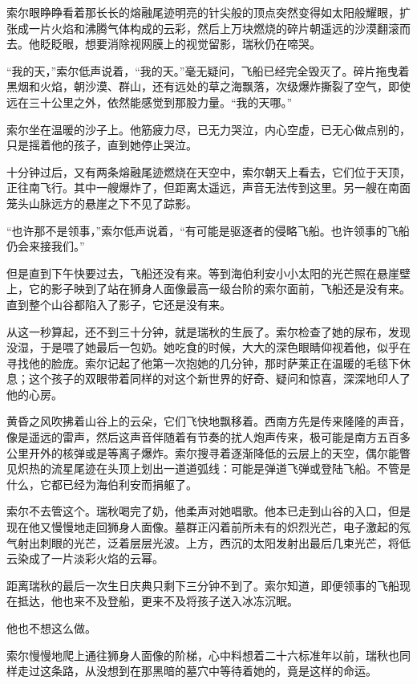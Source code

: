 \documentclass[AutoFakeBold=true]{book}
\begin{document}
索尔眼睁睁看着那长长的熔融尾迹明亮的针尖般的顶点突然变得如太阳般耀眼，扩张成一片火焰和沸腾气体构成的云彩，然后上万块燃烧的碎片朝遥远的沙漠翻滚而去。他眨眨眼，想要消除视网膜上的视觉留影，瑞秋仍在啼哭。

``我的天，''索尔低声说着，``我的天。''毫无疑问，飞船已经完全毁灭了。碎片拖曳着黑烟和火焰，朝沙漠、群山，还有远处的草之海飘落，次级爆炸撕裂了空气，即使远在三十公里之外，依然能感觉到那股力量。``我的天哪。''

索尔坐在温暖的沙子上。他筋疲力尽，已无力哭泣，内心空虚，已无心做点别的，只是摇着他的孩子，直到她停止哭泣。

十分钟过后，又有两条熔融尾迹燃烧在天空中，索尔朝天上看去，它们位于天顶，正往南飞行。其中一艘爆炸了，但距离太遥远，声音无法传到这里。另一艘在南面笼头山脉远方的悬崖之下不见了踪影。

``也许那不是领事，''索尔低声说着，``有可能是驱逐者的侵略飞船。也许领事的飞船仍会来接我们。''

但是直到下午快要过去，飞船还没有来。等到海伯利安小小太阳的光芒照在悬崖壁上，它的影子映到了站在狮身人面像最高一级台阶的索尔面前，飞船还是没有来。直到整个山谷都陷入了影子，它还是没有来。

从这一秒算起，还不到三十分钟，就是瑞秋的生辰了。索尔检查了她的尿布，发现没湿，于是喂了她最后一包奶。她吃食的时候，大大的深色眼睛仰视着他，似乎在寻找他的脸庞。索尔记起了他第一次抱她的几分钟，那时萨莱正在温暖的毛毯下休息；这个孩子的双眼带着同样的对这个新世界的好奇、疑问和惊喜，深深地印人了他的心房。

黄昏之风吹拂着山谷上的云朵，它们飞快地飘移着。西南方先是传来隆隆的声音，像是遥远的雷声，然后这声音伴随着有节奏的扰人炮声传来，极可能是南方五百多公里开外的核弹或是等离子爆炸。索尔搜寻着逐渐降低的云层上的天空，偶尔能瞥见炽热的流星尾迹在头顶上划出一道道弧线：可能是弹道飞弹或登陆飞船。不管是什么，它都已经为海伯利安而捐躯了。

索尔不去管这个。瑞秋喝完了奶，他柔声对她唱歌。他本已走到山谷的入口，但是现在他又慢慢地走回狮身人面像。墓群正闪着前所未有的炽烈光芒，电子激起的氖气射出刺眼的光芒，泛着层层光波。上方，西沉的太阳发射出最后几束光芒，将低云染成了一片淡彩火焰的云幂。

距离瑞秋的最后一次生日庆典只剩下三分钟不到了。索尔知道，即便领事的飞船现在抵达，他也来不及登船，更来不及将孩子送入冰冻沉眠。

他也不想这么做。

索尔慢慢地爬上通往狮身人面像的阶梯，心中料想着二十六标准年以前，瑞秋也同样走过这条路，从没想到在那黑暗的墓穴中等待着她的，竟是这样的命运。
\end{document}
